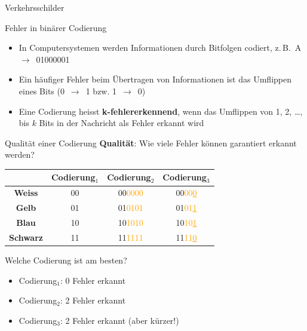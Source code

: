 \begin{frame}{Verkehrsschilder}
    \begin{center}
        \resizebox{.95\textwidth}{!}{}
    \end{center}
\end{frame}

\begin{frame}{Fehler in binärer Codierung}
    \begin{itemize}
        \item In Computersystemen werden Informationen durch Bitfolgen codiert, z.\,B.\ A~$\rightarrow$~01000001
        \item Ein häufiger Fehler beim Übertragen von Informationen ist das Umflippen eines Bits (0~$\rightarrow$~1 bzw. 1~$\rightarrow$~0)
        \item Eine Codierung heisst \textbf{k-fehlererkennend}, wenn das Umflippen von 1, 2, \dots, bis $k$ Bits in der Nachricht als Fehler erkannt wird
    \end{itemize}
\end{frame}

\begin{frame}{Qualität einer Codierung}
    \textbf{Qualität}: Wie viele Fehler können garantiert erkannt werden?
    \begin{table}[H]
        \centering
        \begin{tabular}{cccc}
                             & \textbf{Codierung$_1$} & \textbf{Codierung$_2$}     & \textbf{Codierung$_3$}                \\
            \midrule
            \textbf{Weiss}   & 00                     & 00\textcolor{orange}{0000} & 00\textcolor{orange}{00\underline{0}} \\
            \midrule
            \textbf{Gelb}    & 01                     & 01\textcolor{orange}{0101} & 01\textcolor{orange}{01\underline{1}} \\
            \midrule
            \textbf{Blau}    & 10                     & 10\textcolor{orange}{1010} & 10\textcolor{orange}{10\underline{1}} \\
            \midrule
            \textbf{Schwarz} & 11                     & 11\textcolor{orange}{1111} & 11\textcolor{orange}{11\underline{0}} \\
        \end{tabular}
    \end{table}
    Welche Codierung ist am besten?
    \begin{itemize}
        \item Codierung$_1$: 0 Fehler erkannt
        \item Codierung$_2$: 2 Fehler erkannt
        \item Codierung$_3$: 2 Fehler erkannt (aber kürzer!)
    \end{itemize}
\end{frame}

